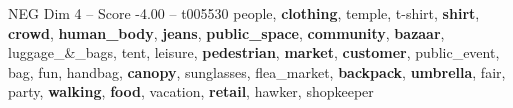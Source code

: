 \begin{textsample}{NEG Dim 4 – Score -4.00 – t005530}  \label{ex:f4_neg_001}
people, \textbf{clothing}, temple, t-shirt, \textbf{shirt}, \textbf{crowd}, \textbf{human\_body}, \textbf{jeans}, \textbf{public\_space}, \textbf{community}, \textbf{bazaar}, luggage\_\&\_bags, tent, leisure, \textbf{pedestrian}, \textbf{market}, \textbf{customer}, public\_event, bag, fun, handbag, \textbf{canopy}, sunglasses, flea\_market, \textbf{backpack}, \textbf{umbrella}, fair, party, \textbf{walking}, \textbf{food}, vacation, \textbf{retail}, hawker, shopkeeper

\end{textsample}
